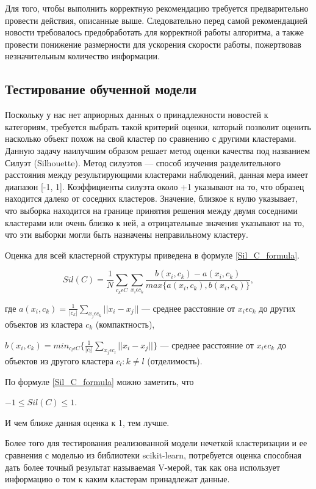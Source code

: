 Для того, чтобы выполнить корректную рекомендацию требуется предварительно провести действия, описанные выше. Следовательно перед самой рекомендацией новости требовалось предобработать для корректной работы алгоритма, а также провести понижение размерности для ускорения скорости работы, пожертвовав незначительным количество информации.

\subsection{Тестирование обученной модели}

Поскольку у нас нет априорных данных о принадлежности новостей к категориям, требуется выбрать такой критерий оценки, который позволит оценить насколько объект похож на свой кластер по сравнению с другими кластерами. Данную задачу наилучшим образом решает метод оценки качества под названием Силуэт (Silhouette). Метод силуэтов --- способ изучения разделительного расстояния между результирующими кластерами наблюдений, данная мера имеет диапазон [-1, 1]. Коэффициенты силуэта около +1 указывают на то, что образец находится далеко от соседних кластеров. Значение, близкое к нулю указывает, что выборка находится на границе принятия решения между двумя соседними кластерами или очень близко к ней, а отрицательные значения указывают на то, что эти выборки могли быть назначены неправильному кластеру.

Оценка для всей кластерной структуры приведена в формуле \ref{Sil_C_formula}.

\begin{equation}
\label{Sil_C_formula}
Sil(C) = \frac{1}{N}\sum_{c_k\epsilon C}\sum_{x_i\epsilon c_k}\frac{b(x_i, c_k) - a(x_i, c_k)}{max\{a(x_i, c_k), b(x_i, c_k)\}},
\end{equation}

где $a(x_i, c_k) = \frac{1}{|c_k|}\sum_{x_j\epsilon c_k}||x_i - x_j||$ --- среднее расстояние от $x_i \epsilon c_k$ до других объектов из кластера $c_k$ (компактность),

$b(x_i, c_k) = min_{c_l\epsilon C}\{\frac{1}{|c_l|}\sum_{x_j \epsilon c_l}||x_i - x_j||\}$ --- среднее расстояние от $x_i \epsilon c_k$ до объектов из другого кластера $c_l : k \neq l$ (отделимость).
	
По формуле \ref{Sil_C_formula} можно заметить, что

$-1 \leqslant Sil(C) \leqslant 1.$

И чем ближе данная оценка к 1, тем лучше.

Более того для тестирования реализованной модели нечеткой кластеризации и ее сравнения с моделью из библиотеки scikit-learn, потребуется оценка способная дать более точный результат называемая V-мерой, так как она использует информацию о том к каким кластерам принадлежат данные.

